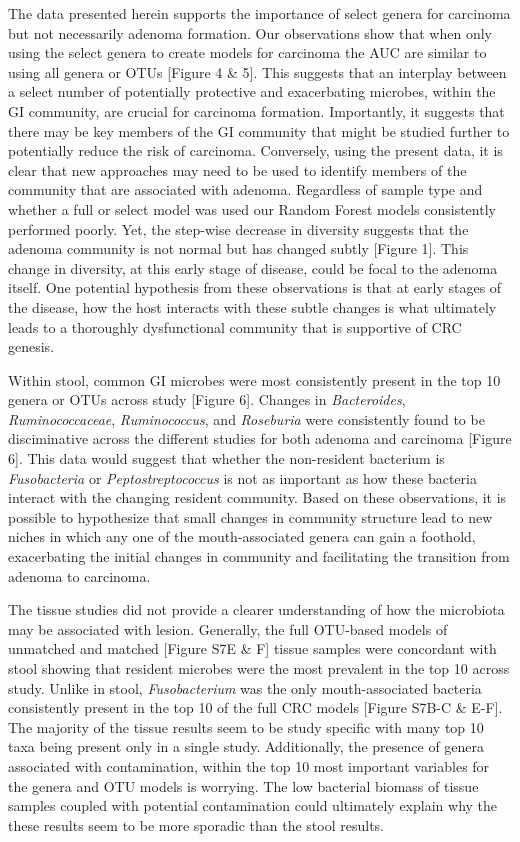 \documentclass[12pt,]{article}
\begin{document}
The data presented herein supports the importance of select genera for
carcinoma but not necessarily adenoma formation. Our observations show
that when only using the select genera to create models for carcinoma
the AUC are similar to using all genera or OTUs {[}Figure 4 \& 5{]}.
This suggests that an interplay between a select number of potentially
protective and exacerbating microbes, within the GI community, are
crucial for carcinoma formation. Importantly, it suggests that there may
be key members of the GI community that might be studied further to
potentially reduce the risk of carcinoma. Conversely, using the present
data, it is clear that new approaches may need to be used to identify
members of the community that are associated with adenoma. Regardless of
sample type and whether a full or select model was used our Random
Forest models consistently performed poorly. Yet, the step-wise decrease
in diversity suggests that the adenoma community is not normal but has
changed subtly {[}Figure 1{]}. This change in diversity, at this early
stage of disease, could be focal to the adenoma itself. One potential
hypothesis from these observations is that at early stages of the
disease, how the host interacts with these subtle changes is what
ultimately leads to a thoroughly dysfunctional community that is
supportive of CRC genesis.

Within stool, common GI microbes were most consistently present in the
top 10 genera or OTUs across study {[}Figure 6{]}. Changes in
\emph{Bacteroides}, \emph{Ruminococcaceae}, \emph{Ruminococcus}, and
\emph{Roseburia} were consistently found to be disciminative across the
different studies for both adenoma and carcinoma {[}Figure 6{]}. This
data would suggest that whether the non-resident bacterium is
\emph{Fusobacteria} or \emph{Peptostreptococcus} is not as important as
how these bacteria interact with the changing resident community. Based
on these observations, it is possible to hypothesize that small changes
in community structure lead to new niches in which any one of the
mouth-associated genera can gain a foothold, exacerbating the initial
changes in community and facilitating the transition from adenoma to
carcinoma.

The tissue studies did not provide a clearer understanding of how the
microbiota may be associated with lesion. Generally, the full OTU-based
models of unmatched and matched {[}Figure S7E \& F{]} tissue samples
were concordant with stool showing that resident microbes were the most
prevalent in the top 10 across study. Unlike in stool,
\emph{Fusobacterium} was the only mouth-associated bacteria consistently
present in the top 10 of the full CRC models {[}Figure S7B-C \& E-F{]}.
The majority of the tissue results seem to be study specific with many
top 10 taxa being present only in a single study. Additionally, the
presence of genera associated with contamination, within the top 10 most
important variables for the genera and OTU models is worrying. The low
bacterial biomass of tissue samples coupled with potential contamination
could ultimately explain why the these results seem to be more sporadic
than the stool results.
\end{document}
